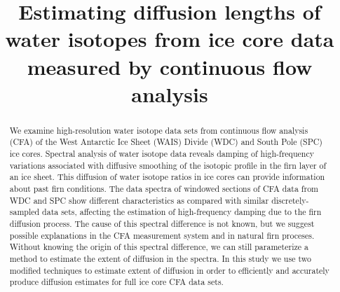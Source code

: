 \documentclass[draft, jgrga]{AGUTeX}
\begin{document}

\title{Estimating diffusion lengths of water isotopes from ice core data measured by continuous flow analysis}









\begin{abstract}

We examine high-resolution water isotope data sets from continuous flow analysis (CFA) of the West Antarctic Ice Sheet (WAIS) Divide (WDC) and South Pole (SPC) ice cores. Spectral analysis of water isotope data reveals damping of high-frequency variations associated with diffusive smoothing of the isotopic profile in the firn layer of an ice sheet. This diffusion of water isotope ratios in ice cores can provide information about past firn conditions. The data spectra of windowed sections of CFA data from WDC and SPC show different characteristics as compared with similar discretely-sampled data sets, affecting the estimation of high-frequency damping due to the firn diffusion process. The cause of this spectral difference is not known, but we suggest possible explanations in the CFA measurement system and in natural firn proceses. Without knowing the origin of this spectral difference, we can still parameterize a method to estimate the extent of diffusion in the spectra. In this study we use two modified techniques to estimate extent of diffusion in order to efficiently and accurately produce diffusion estimates for full ice core CFA data sets.

\end{abstract}
\end{document}
